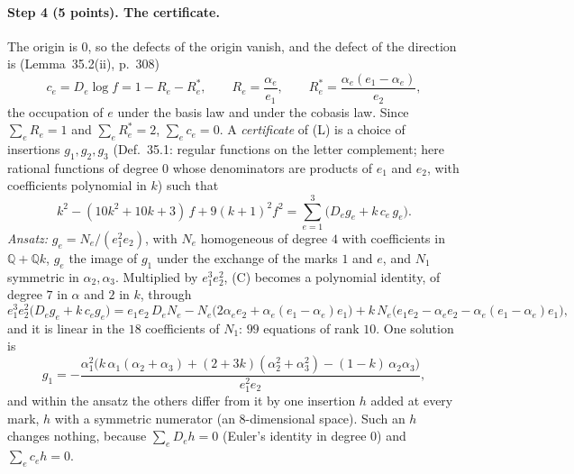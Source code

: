 \documentclass[11pt]{article}
\theoremstyle{plain}
\theoremstyle{definition}
\theoremstyle{remark}
\begin{document}
\paragraph{Step 4 (5 points). The certificate.}
The origin is $0$, so the defects of the origin vanish, and the defect of the direction is (Lemma~35.2(ii), p.~308)
\[
c_e=D_e\log f=1-R_e-R^\ast_e,\qquad R_e=\frac{\alpha_e}{e_1},\qquad R^\ast_e=\frac{\alpha_e(e_1-\alpha_e)}{e_2},
\]
the occupation of $e$ under the basis law and under the cobasis law. Since $\sum_eR_e=1$ and $\sum_eR^\ast_e=2$, $\sum_ec_e=0$. A \emph{certificate} of (L) is a choice of insertions $g_1,g_2,g_3$ (Def.~35.1: regular functions on the letter complement; here rational functions of degree $0$ whose denominators are products of $e_1$ and $e_2$, with coefficients polynomial in $k$) such that
\begin{equation}\tag{C}
k^2-(10k^2+10k+3)\,f+9(k+1)^2f^2=\sum_{e=1}^3\big(D_eg_e+k\,c_e\,g_e\big).
\end{equation}
\emph{Ansatz:} $g_e=N_e/(e_1^2e_2)$, with $N_e$ homogeneous of degree $4$ with coefficients in $\mathbb Q+\mathbb Qk$, $g_e$ the image of $g_1$ under the exchange of the marks $1$ and $e$, and $N_1$ symmetric in $\alpha_2,\alpha_3$. Multiplied by $e_1^3e_2^2$, (C) becomes a polynomial identity, of degree $7$ in $\alpha$ and $2$ in $k$, through
\[
e_1^3e_2^2\big(D_eg_e+k\,c_eg_e\big)=e_1e_2\,D_eN_e-N_e\big(2\alpha_ee_2+\alpha_e(e_1-\alpha_e)e_1\big)+k\,N_e\big(e_1e_2-\alpha_ee_2-\alpha_e(e_1-\alpha_e)e_1\big),
\]
and it is linear in the $18$ coefficients of $N_1$: $99$ equations of rank $10$. One solution is
\begin{equation}\tag{G}
g_1=-\frac{\alpha_1^2\big(k\,\alpha_1(\alpha_2+\alpha_3)+(2+3k)(\alpha_2^2+\alpha_3^2)-(1-k)\,\alpha_2\alpha_3\big)}{e_1^2e_2},
\end{equation}
and within the ansatz the others differ from it by one insertion $h$ added at every mark, $h$ with a symmetric numerator (an $8$-dimensional space). Such an $h$ changes nothing, because $\sum_eD_eh=0$ (Euler's identity in degree $0$) and $\sum_ec_eh=0$.
\end{document}
